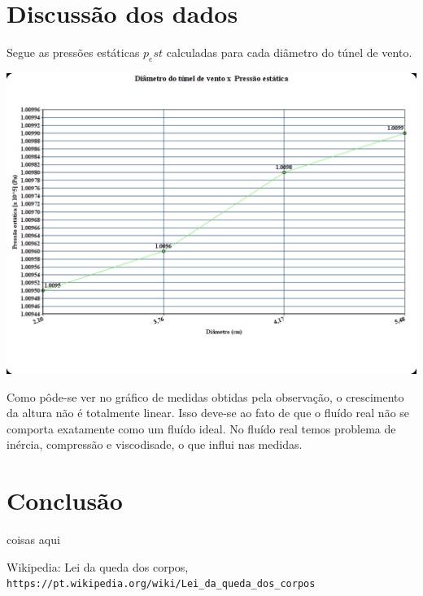 \documentclass[a4paper]{article}
\begin{document}
\section{Discussão dos dados}
    Segue as pressões estáticas $p_est$ calculadas para cada diâmetro do túnel de vento.
        \begin{center}
              \includegraphics[width=\linewidth]{img/graphPression.png}
              \label{graph}
        \end{center}

        Como pôde-se ver no gráfico de medidas obtidas pela observação, o crescimento da altura não é totalmente linear. Isso deve-se ao fato de que o fluído real não se comporta exatamente como um fluído ideal. No fluído real temos problema de inércia, compressão e viscodisade, o que influi nas medidas.

\section{Conclusão}
    coisas aqui

\begin{thebibliography}{1}

    Wikipedia: Lei da queda dos corpos,
    \\\texttt{https://pt.wikipedia.org/wiki/Lei\_da\_queda\_dos\_corpos}
\end{thebibliography}
\end{document}
